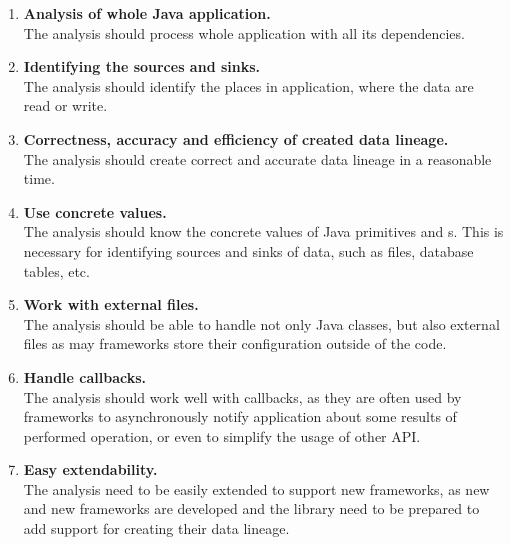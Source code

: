 \begin{enumerate}
  \item \textbf{Analysis of whole Java application.} \\
    The analysis should process whole application with all its dependencies.
  \item \textbf{Identifying the sources and sinks.} \\
    The analysis should identify the places in application, where the data
    are read or write.
  \item \textbf{Correctness, accuracy and efficiency of created data lineage.} \\
    The analysis should create correct and accurate data lineage in a reasonable time.
  \item \textbf{Use concrete values.} \\
    The analysis should know the concrete values of Java primitives and s.
    This is necessary for identifying sources and sinks of data,
    such as files, database tables, etc.
  \item \textbf{Work with external files.} \\
    The analysis should be able to handle not only Java classes,
    but also external files as may frameworks store their configuration
    outside of the code.
  \item \textbf{Handle callbacks.} \\
    The analysis should work well with callbacks, as they are often
    used by frameworks to asynchronously notify application
    about some results of performed operation, or even
    to simplify the usage of other API.
  \item \textbf{Easy extendability.} \\
    The analysis need to be easily extended to support new frameworks,
    as new and new frameworks are developed and the library need to be
    prepared to add support for creating their data lineage.
\end{enumerate}



